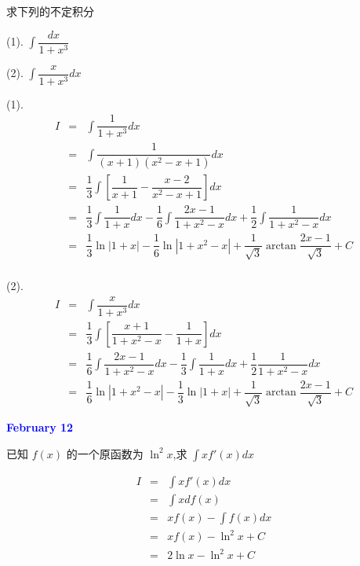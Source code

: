 \begin{example}[][Exam: 28.2.8]
	求下列的不定积分

(1). $\displaystyle{\int \dfrac{dx}{1+x^{3}}}$

(2). $\displaystyle{\int \dfrac{x}{1+x^{3}}dx}$
\end{example}
\begin{solution}

	(1). 
	\begin{eqnarray*}
		I & = & \int \dfrac{1}{1+x^{3}}dx\\
		  & = & \int \dfrac{1}{(x+1)(x^{2}-x+1)}dx\\
		  & = & \dfrac{1}{3}\int \left[\dfrac{1}{x+1}-\dfrac{x-2}{x^{2}-x+1}\right]dx\\
		  & = & \dfrac{1}{3}\int \dfrac{1}{1+x}dx - \dfrac{1}{6}\int \dfrac{2x-1}{1+x^{2}-x}dx + \dfrac{1}{2}\int \dfrac{1}{1+x^{2}-x}dx\\
		  & = & \dfrac{1}{3}\ln |1+x| - \dfrac{1}{6}\ln |1+x^{2}-x| + \dfrac{1}{\sqrt{3}}\arctan \dfrac{2x-1}{\sqrt{3}} + C\\
	\end{eqnarray*}

	(2). 
	\begin{eqnarray*}
		I & = & \int \dfrac{x}{1+x^{3}}dx\\
		  & = & \dfrac{1}{3}\int \left[\dfrac{x+1}{1+x^{2}-x}-\dfrac{1}{1+x}\right]dx\\
		  & = & \dfrac{1}{6}\int \dfrac{2x-1}{1+x^{2}-x}dx - \dfrac{1}{3}\int \dfrac{1}{1+x}dx + \dfrac{1}{2}\dfrac{1}{1+x^{2}-x}dx\\
		  & = & \dfrac{1}{6}\ln |1+x^{2}-x| - \dfrac{1}{3}\ln |1+x| + \dfrac{1}{\sqrt{3}}\arctan \dfrac{2x-1}{\sqrt{3}} + C
	\end{eqnarray*}
\end{solution}

\textcolor{blue}{\textbf{February 12}}

\begin{example}[][Exam: 28.2.9]
	已知 $f(x)$ 的一个原函数为 $\ln^{2}x$,求 $\int xf'(x)dx$
\end{example}
\begin{solution}
	\begin{eqnarray*}
		I & = & \int xf'(x)dx\\
		  & = & \int xdf(x)\\
		  & = & xf(x) - \int f(x)dx \\
		  & = & xf(x) - \ln^{2}x + C\\
		  & = & 2\ln x - \ln^{2}x + C
	\end{eqnarray*}
\end{solution}

